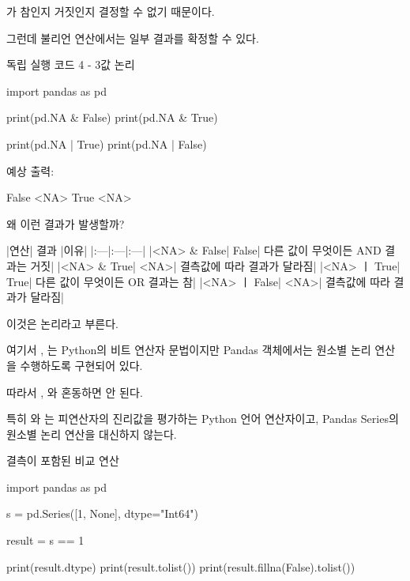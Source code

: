 가 참인지 거짓인지 결정할 수 없기 때문이다.

그런데 불리언 연산에서는 일부 결과를 확정할 수 있다.

\begin{dhknote}
\begin{dhksmry}[centered]
독립 실행 코드 4 - 3값 논리
\end{dhksmry}
\end{dhknote}

\begin{dhkcode}
import pandas as pd

print(pd.NA & False)
print(pd.NA & True)

print(pd.NA | True)
print(pd.NA | False)
\end{dhkcode}

예상 출력:

\begin{dhkzsh}
False
<NA>
True
<NA>
\end{dhkzsh}

왜 이런 결과가 발생할까?

\begin{dhktable}
|연산|	결과	|이유|
|:---|:---|:---|
|<NA> & False|	False|	다른 값이 무엇이든 AND 결과는 거짓|
|<NA> & True|	<NA>|	결측값에 따라 결과가 달라짐|
|<NA> ㅣ True|	True|	다른 값이 무엇이든 OR 결과는 참|
|<NA> ㅣ False|	<NA>|	결측값에 따라 결과가 달라짐|
\end{dhktable}

이것은  논리라고 부른다.

여기서 \zsh{&}, \zsh{|}는 Python의 비트 연산자 문법이지만 Pandas 객체에서는 원소별 논리 연산을 수행하도록 구현되어 있다.

따라서 , 와 혼동하면 안 된다.

특히 와 는 피연산자의 진리값을 평가하는 Python 언어 연산자이고, Pandas Series의 원소별 논리 연산을 대신하지 않는다.

\begin{dhknote}
\begin{dhksmry}[centered]
결측이 포함된 비교 연산
\end{dhksmry}
\end{dhknote}

\begin{dhkcode}
import pandas as pd

s = pd.Series([1, None], dtype="Int64")

result = s == 1

print(result.dtype)
print(result.tolist())
print(result.fillna(False).tolist())
\end{dhkcode}


